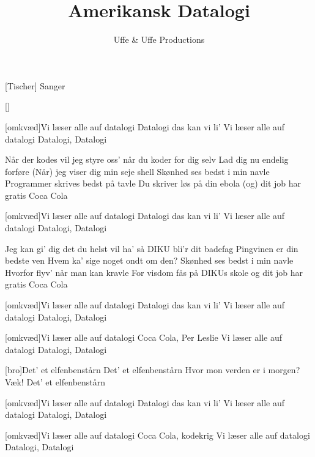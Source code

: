 \documentclass[a4paper,11pt]{article}
\title{Amerikansk Datalogi}
\author{Uffe \& Uffe Productions}
\begin{document}
\maketitle

\begin{roles}
[Tischer] Sanger
\end{roles}

\begin{props}
[]
\end{props}

  
\begin{song}

[omkvæd]Vi læser alle auf datalogi
Datalogi das kan vi li'
Vi læser alle auf datalogi
Datalogi, Datalogi

Når der kodes vil jeg styre
oss' når du koder for dig selv
Lad dig nu endelig forføre
(Når) jeg viser dig min seje shell
Skønhed ses bedst i min navle
Programmer skrives bedst på tavle
Du skriver løs på din ebola
(og) dit job har gratis Coca Cola


[omkvæd]Vi læser alle auf datalogi
Datalogi das kan vi li'
Vi læser alle auf datalogi
Datalogi, Datalogi


Jeg kan gi' dig det du helst vil ha'
så DIKU bli'r dit badefag
Pingvinen er din bedste ven
Hvem ka' sige noget ondt om den?
Skønhed ses bedst i min navle
Hvorfor flyv' når man kan kravle
For visdom fås på DIKUs skole
og dit job har gratis Coca Cola


[omkvæd]Vi læser alle auf datalogi
Datalogi das kan vi li'
Vi læser alle auf datalogi
Datalogi, Datalogi


[omkvæd]Vi læser alle auf datalogi
Coca Cola, Per Leslie
Vi læser alle auf datalogi
Datalogi, Datalogi


[bro]Det' et elfenbenstårn
Det' et elfenbenstårn
Hvor mon verden er i morgen? Væk! 
Det' et elfenbenstårn


[omkvæd]Vi læser alle auf datalogi
Datalogi das kan vi li'
Vi læser alle auf datalogi
Datalogi, Datalogi


[omkvæd]Vi læser alle auf datalogi
Coca Cola, kodekrig
Vi læser alle auf datalogi
Datalogi, Datalogi


\end{song}
\end{document}
